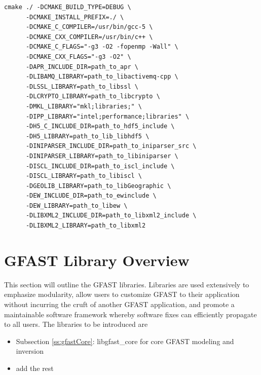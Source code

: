 \documentclass[12pt]{article}
\begin{document}
\begin{verbatim}
cmake ./ -DCMAKE_BUILD_TYPE=DEBUG \
      -DCMAKE_INSTALL_PREFIX=./ \
      -DCMAKE_C_COMPILER=/usr/bin/gcc-5 \
      -DCMAKE_CXX_COMPILER=/usr/bin/c++ \
      -DCMAKE_C_FLAGS="-g3 -O2 -fopenmp -Wall" \
      -DCMAKE_CXX_FLAGS="-g3 -O2" \
      -DAPR_INCLUDE_DIR=path_to_apr \
      -DLIBAMQ_LIBRARY=path_to_libactivemq-cpp \
      -DLSSL_LIBRARY=path_to_libssl \
      -DLCRYPTO_LIBRARY=path_to_libcrypto \
      -DMKL_LIBRARY="mkl;libraries;" \
      -DIPP_LIBRARY="intel;performance;libraries" \
      -DH5_C_INCLUDE_DIR=path_to_hdf5_include \
      -DH5_LIBRARY=path_to_lib_libhdf5 \
      -DINIPARSER_INCLUDE_DIR=path_to_iniparser_src \
      -DINIPARSER_LIBRARY=path_to_libiniparser \
      -DISCL_INCLUDE_DIR=path_to_iscl_include \
      -DISCL_LIBRARY=path_to_libiscl \
      -DGEOLIB_LIBRARY=path_to_libGeographic \
      -DEW_INCLUDE_DIR=path_to_ewinclude \
      -DEW_LIBRARY=path_to_libew \
      -DLIBXML2_INCLUDE_DIR=path_to_libxml2_include \
      -DLIBXML2_LIBRARY=path_to_libxml2
\end{verbatim}

\clearpage
\section{GFAST Library Overview}
This section will outline the GFAST libraries.  Libraries are used extensively 
to emphasize modularity, allow users to customize GFAST to their application 
without incurring the cruft of another GFAST application, and promote a maintainable
software framework whereby software fixes can efficiently propagate to all users.  
The libraries to be introduced are
\begin{itemize}
 \item Subsection \ref{ss:gfastCore}: libgfast\_core for core GFAST modeling and inversion  
 \item add the rest
\end{itemize}

\clearpage
\end{document}
